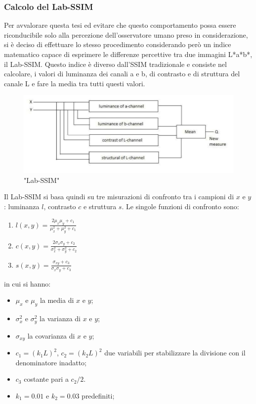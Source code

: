 \documentclass[a4paper,11pt]{article}
\begin{document}
    \subsubsection{Calcolo del Lab-SSIM}
    Per avvalorare questa tesi ed evitare che questo comportamento possa essere riconducibile solo alla percezione dell'osservatore umano preso in considerazione, si è deciso
    di effettuare lo stesso procedimento considerando però un indice matematico capace di esprimere le differenze percettive tra due immagini L*a*b*, il Lab-SSIM.
    Questo indice è diverso dall'SSIM tradizionale e consiste nel calcolare, i valori di luminanza dei canali a e b, di contrasto e di struttura del canale L e fare la media tra tutti questi valori.
    \begin{figure}[h]
        \centering
        \includegraphics[scale=0.7]{labssim.png}
        \caption{"Lab-SSIM"}
    \end{figure}

    Il Lab-SSIM si basa quindi su tre misurazioni di confronto tra i campioni di $x$ e $y$: luminanza $l$, contrasto $c$ e struttura $s$. Le singole funzioni di confronto sono:
    \begin{enumerate} 
        \item $l(x,y)=\frac{2\mu_x\mu_y + c_1}{\mu^2_x + \mu^2_y + c_1}$
        \item $c(x,y)=\frac{2\sigma_x\sigma_y + c_2}{\sigma^2_x + \sigma^2_y + c_2}$
        \item $s(x,y)=\frac{\sigma_{xy} + c_3}{\sigma_x \sigma_y + c_3}$
    \end{enumerate}
    in cui si hanno:
    \begin{itemize} 
        \item $\mu_x$ e $\mu_y$ la media di $x$ e $y$;
        \item $\sigma_x^2$ e $\sigma_y^2$  la varianza di $x$ e $y$;
        \item $\sigma_{xy}$ la covarianza di $x$ e $y$;
        \item $c_1=(k_1L)^2$, $c_2=(k_2L)^2$ due variabili per stabilizzare la divisione con il denominatore inadatto;
        \item $c_3$ costante pari a $c_2 / 2$.
        \item $k_1=0.01$ e $k_2=0.03$ predefiniti;
   \end{itemize}
   \newpage
    
\end{document}
